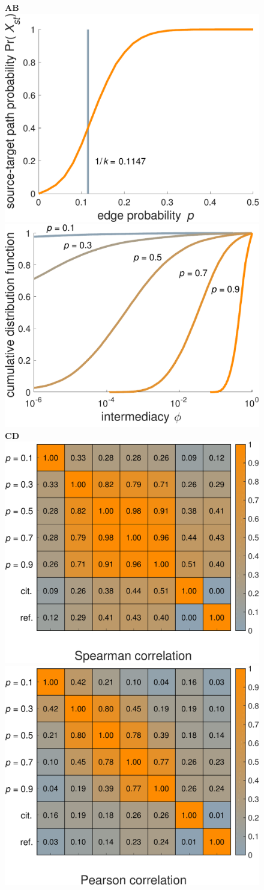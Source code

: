 \documentclass[9pt,twocolumn,twoside]{pnas-alt} %
\theoremstyle{definition}
\begin{document}
\begin{sansmath}\begin{figure}
  \centering%
  \begin{minipage}{7.4cm}
  	\hskip8pt\textbf{\textsf{\footnotesize A}}\hskip104pt\textbf{\textsf{\footnotesize B}}\\\vskip-8pt%
    \includegraphics[width=0.45\linewidth]{phist_Q}\linewidth
    \includegraphics[width=0.45\linewidth]{distributions_Q}\\\vskip-12pt\hskip8pt\textbf{\textsf{\footnotesize C}}\hskip104pt\textbf{\textsf{\footnotesize D}}\\\vskip-6pt%
    \includegraphics[width=0.466\linewidth]{spearman_Q}\linewidth
    \includegraphics[width=0.466\linewidth]{pearson_Q}%

\end{minipage}
\end{figure}
\end{sansmath}
\end{document}
